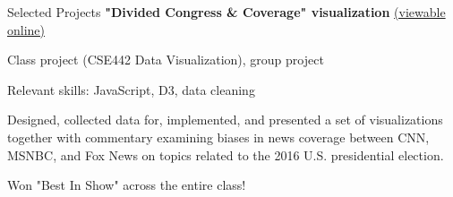 \begin{rubric}{Selected Projects}
\entry*[2018] %
	\textbf{"Divided Congress \& Coverage" visualization} \href{https://cse442-18f.github.io/fp-divided-congress-and-coverage/}{(viewable online)}
	\par Class project (CSE442 Data Visualization), group project
	\par Relevant skills: JavaScript, D3, data cleaning
	\par Designed, collected data for, implemented, and presented a set of visualizations together with commentary examining biases in news coverage between CNN, MSNBC, and Fox News on topics related to the 2016 U.S. presidential election.
	\par Won "Best In Show" across the entire class!

\end{rubric}
